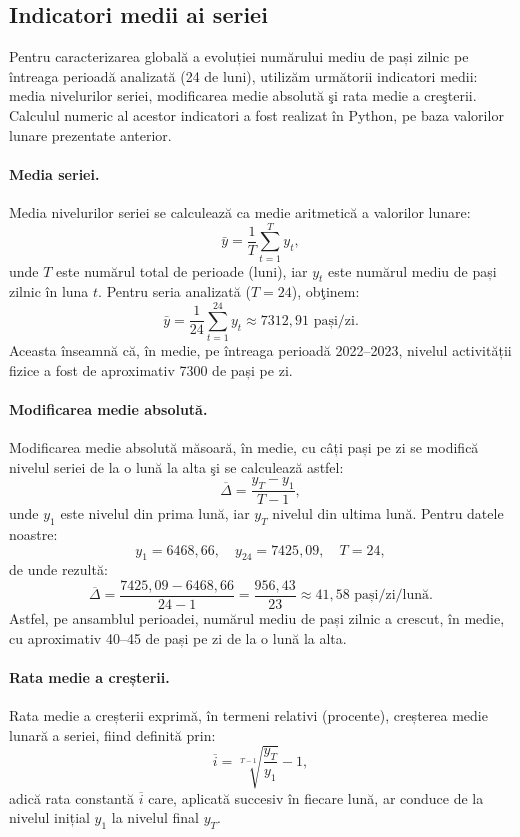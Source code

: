 \documentclass[12pt,a4paper]{report}
\begin{document}
\subsection{Indicatori medii ai seriei}

Pentru caracterizarea globală a evoluției numărului mediu de pași zilnic pe întreaga perioadă analizată (24 de luni), utilizăm următorii indicatori medii: media nivelurilor seriei, modificarea medie absolută şi rata medie a creşterii. Calculul numeric al acestor indicatori a fost realizat în Python, pe baza valorilor lunare prezentate anterior.

\paragraph{Media seriei.}
Media nivelurilor seriei se calculează ca medie aritmetică a valorilor lunare:
\[
\bar{y} = \frac{1}{T} \sum_{t=1}^{T} y_t,
\]
unde \(T\) este numărul total de perioade (luni), iar \(y_t\) este numărul mediu de pași zilnic în luna \(t\). Pentru seria analizată (\(T = 24\)), obţinem:
\[
\bar{y} = \frac{1}{24} \sum_{t=1}^{24} y_t \approx 7312{,}91 \text{ pași/zi}.
\]
Aceasta înseamnă că, în medie, pe întreaga perioadă 2022--2023, nivelul activității fizice a fost de aproximativ 7300 de pași pe zi.

\paragraph{Modificarea medie absolută.}
Modificarea medie absolută măsoară, în medie, cu câți pași pe zi se modifică nivelul seriei de la o lună la alta şi se calculează astfel:
\[
\overline{\Delta} = \frac{y_T - y_1}{T-1},
\]
unde \(y_1\) este nivelul din prima lună, iar \(y_T\) nivelul din ultima lună. Pentru datele noastre:
\[
y_1 = 6468{,}66, \quad y_{24} = 7425{,}09, \quad T = 24,
\]
de unde rezultă:
\[
\overline{\Delta} = \frac{7425{,}09 - 6468{,}66}{24 - 1}
= \frac{956{,}43}{23} \approx 41{,}58 \text{ pași/zi/lună}.
\]
Astfel, pe ansamblul perioadei, numărul mediu de pași zilnic a crescut, în medie, cu aproximativ 40–45 de pași pe zi de la o lună la alta.

\paragraph{Rata medie a creșterii.}
Rata medie a creșterii exprimă, în termeni relativi (procente), creșterea medie lunară a seriei, fiind definită prin:
\[
\overline{i} = \sqrt[T-1]{\frac{y_T}{y_1}} - 1,
\]
adică rata constantă \( \overline{i} \) care, aplicată succesiv în fiecare lună, ar conduce de la nivelul inițial \(y_1\) la nivelul final \(y_T\).
\end{document}
